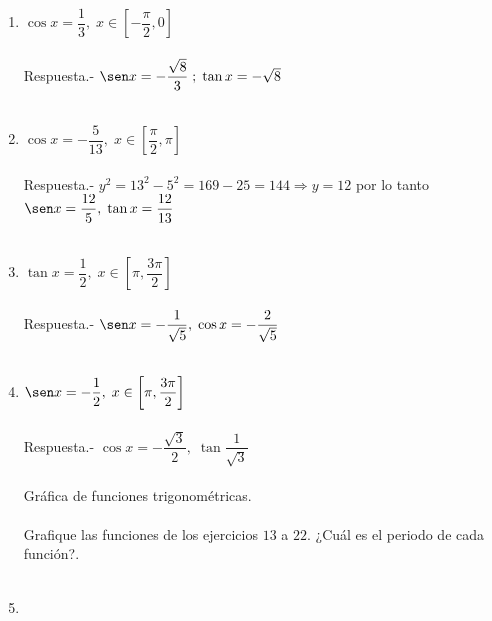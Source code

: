 \begin{enumerate}
\item $\cos x = \dfrac{1}{3}, \; x \in \left[-\dfrac{\pi}{2},0\right]$\\\\
    Respuesta.-\; $\sen x= -\dfrac{\sqrt{8}}{3} \; ; \; \tan x = -\sqrt{8}$\\\\

\item $\cos x = -\dfrac{5}{13},\; x \in \left[\dfrac{\pi}{2},\pi\right]$\\\\
    Respuesta.-\; $ y^2 = 13^2 - 5^2 = 169 - 25 = 144 \Longrightarrow y=12$ por lo tanto $\sen x = \dfrac{12}{5},\; \tan x = \dfrac{12}{13}$\\\\

\item $\tan x = \dfrac{1}{2},\; x \in \left[\pi, \dfrac{3\pi}{2}\right]$\\\\
    Respuesta.-\; $\sen x = -\dfrac{1}{\sqrt{5}},\; \cos x = -\dfrac{2}{\sqrt{5}}$\\\\

\item $\sen x = -\dfrac{1}{2},\; x\in \left[\pi, \dfrac{3\pi}{2}\right]$\\\\
    Respuesta.-\; $\cos x = -\dfrac{\sqrt{3}}{2}, \; \tan \dfrac{1}{\sqrt{3}}$\\\\

Gráfica de funciones trigonométricas.\\\\
Grafique las funciones de los ejercicios $13$ a $22$. ¿Cuál es el periodo de cada función?.\\\\

\item 

\end{enumerate}
